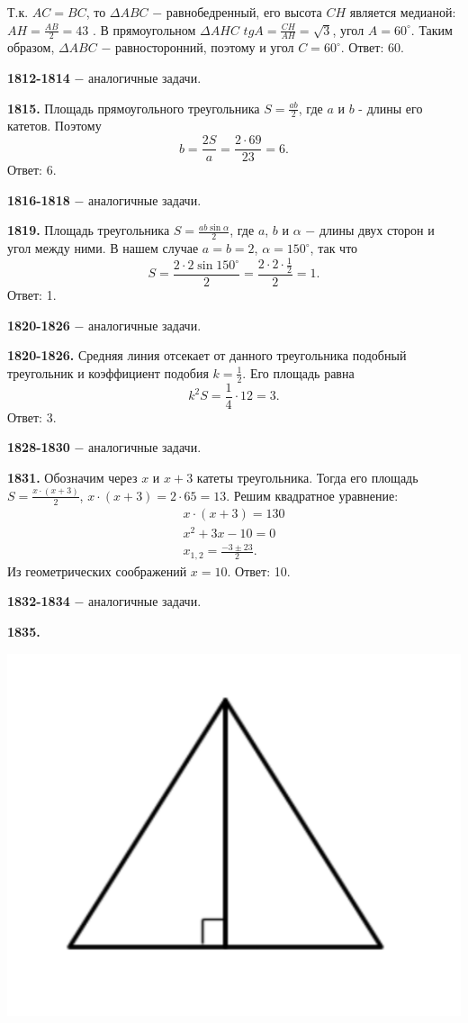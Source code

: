 Т.к. $AC=BC$, то $\Delta ABC$ $-$ равнобедренный, его высота $CH$ является медианой: $AH = \frac{AB}{2}=43$ . В прямоугольном $\Delta AHC$ $tgA=\frac{CH}{AH} = \sqrt{3}$, угол $A = 60^\circ$. Таким образом, $\Delta ABC$ $-$ равносторонний, поэтому и угол $C = 60^\circ.$
\newline \null \hspace*{\fill} Ответ: 60.

\textbf{1812-1814} $-$ аналогичные задачи.

\textbf{1815.}  Площадь прямоугольного треугольника $S = \frac{ab}{2}$, где $a$ и \newline $b$ - длины его катетов. Поэтому
\[
b = \frac{2S}{a} = \frac{2 \cdot 69}{23} = 6.
\] \null \hspace*{\fill} Ответ: 6.

\textbf{1816-1818} $-$ аналогичные задачи.

\textbf{1819.} Площадь треугольника $S = \frac{ab\sin{\alpha}}{2}$, где $a$, $b$ и $\alpha$ $-$ длины двух сторон и угол между ними. В нашем случае $a = b = 2$, $\alpha = 150^\circ$, так что
\[
S = \frac{2 \cdot 2 \sin{150^\circ}}{2} = \frac{2 \cdot 2 \cdot \frac{1}{2}}{2} = 1.
\]\null \hspace*{\fill} Ответ: 1.

\textbf{1820-1826} $-$ аналогичные задачи.

\textbf{1820-1826.} Средняя линия отсекает от данного треугольника подобный треугольник и коэффициент подобия $k = \frac{1}{2}$. Его площадь равна 
\[
k^2S=\frac{1}{4}\cdot12=3.
\]\null \hspace*{\fill} Ответ: 3.

\textbf{1828-1830} $-$ аналогичные задачи.

\textbf{1831.} Обозначим через $x$ и $x+3$ катеты треугольника. Тогда его площадь $S = \frac{x\cdot(x+3)}{2}$, $x\cdot(x+3)=2\cdot65=13$. Решим квадратное уравнение:
\[
\begin{aligned}
	x\cdot(x+3)=130 \\
	 x^2+3x-10=0 \\
	 x_{1,2}=\frac{-3\pm 23}{2}.
\end{aligned}
\]
Из геометрических соображений $x =10$. \newline \null \hspace*{\fill} Ответ: 10.

\textbf{1832-1834} $-$ аналогичные задачи.

\textbf{1835.}

{\centering \includegraphics[width=0.4\linewidth]{Geometry/Content/18.png}
	
}

